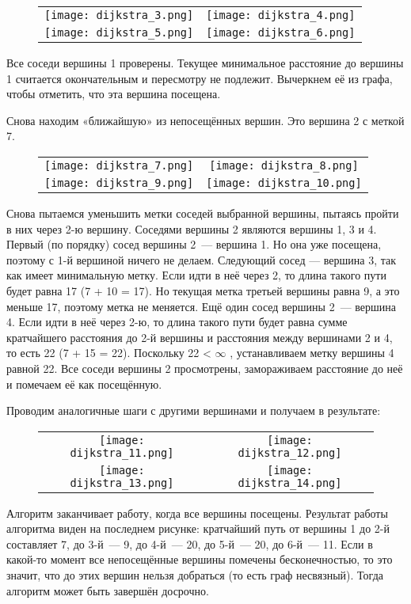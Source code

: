 \begin{figure}[!h]
    \centering 
    \begin{tabular}{cc}
        \texttt{[image: dijkstra\_3.png]} & \texttt{[image: dijkstra\_4.png]} \\
        \texttt{[image: dijkstra\_5.png]} & \texttt{[image: dijkstra\_6.png]}
    \end{tabular}
\end{figure}

Все соседи вершины 1 проверены.
Текущее минимальное расстояние до вершины 1 считается окончательным и пересмотру не подлежит.
Вычеркнем её из графа, чтобы отметить, что эта вершина посещена. 

Снова находим «ближайшую» из непосещённых вершин. Это вершина 2 с меткой 7. 

\begin{figure}[!h]
    \centering 
    \begin{tabular}{cc}
        \texttt{[image: dijkstra\_7.png]} & \texttt{[image: dijkstra\_8.png]} \\
        \texttt{[image: dijkstra\_9.png]} & \texttt{[image: dijkstra\_10.png]}
    \end{tabular}
\end{figure}

Снова пытаемся уменьшить метки соседей выбранной вершины, пытаясь пройти в них через 2-ю вершину. Соседями вершины 2 являются вершины 1, 3 и 4.
Первый (по порядку) сосед вершины 2 — вершина 1. Но она уже посещена, поэтому с 1-й вершиной ничего не делаем.
Следующий сосед — вершина 3, так как имеет минимальную метку.
Если идти в неё через 2, то длина такого пути будет равна 17 (7 + 10 = 17). Но текущая метка третьей вершины равна 9, а это меньше 17, поэтому метка не меняется. 
Ещё один сосед вершины 2 — вершина 4.
Если идти в неё через 2-ю, то длина такого пути будет равна сумме кратчайшего расстояния до 2-й вершины и расстояния между вершинами 2 и 4, то есть 22 (7 + 15 = 22).
Поскольку 22 < $\infty$ , устанавливаем метку вершины 4 равной 22.
Все соседи вершины 2 просмотрены, замораживаем расстояние до неё и помечаем её как посещённую. 

Проводим аналогичные шаги с другими вершинами и получаем в результате:

\begin{figure}[!h]
    \centering 
    \begin{tabular}{cc}
        \texttt{[image: dijkstra\_11.png]} & \texttt{[image: dijkstra\_12.png]} \\
        \texttt{[image: dijkstra\_13.png]} & \texttt{[image: dijkstra\_14.png]}
    \end{tabular}
\end{figure}

Алгоритм заканчивает работу, когда все вершины посещены.
Результат работы алгоритма виден на последнем рисунке: кратчайший путь от вершины 1 до 2-й составляет 7, до 3-й — 9, до 4-й — 20, до 5-й — 20, до 6-й — 11.
Если в какой-то момент все непосещённые вершины помечены бесконечностью, то это значит, что до этих вершин нельзя добраться (то есть граф несвязный). Тогда алгоритм может быть завершён досрочно. 